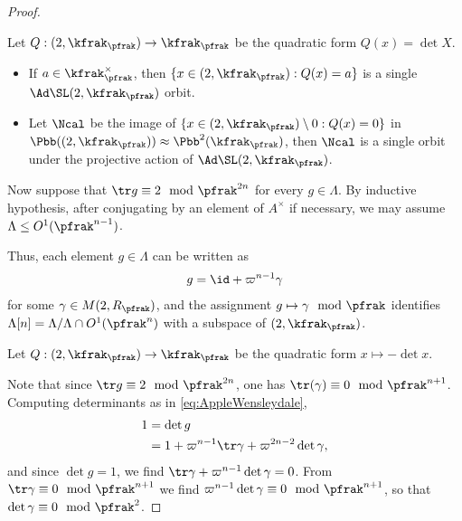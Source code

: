 \begin{proof}
    \begin{lemma}\label{lemma:killingform}
        Let $Q: \sl(2,\kfrak_\pfrak) \to \kfrak_\pfrak$ be the quadratic form $Q(x) = \det X$.
        \begin{itemize}
            \item If $a \in \kfrak_\pfrak^\times$, then $\{x \in \sl(2,\kfrak_\pfrak): Q(x) = a\}$ is a single $\Ad \SL(2,\kfrak_\pfrak)$ orbit.
            \item Let $\Ncal$ be the image of $\{x \in \sl(2,\kfrak_\pfrak) \setminus 0:  Q(x)=0\}$ in $\Pbb(\sl(2,\kfrak_\pfrak))\approx \Pbb^2(\kfrak_\pfrak)$, then $\Ncal$ is a single orbit under the projective action of $\Ad \SL(2,\kfrak_\pfrak)$.
        \end{itemize}

    \end{lemma}
    Now suppose that $\tr g \equiv 2 \mod \pfrak^{2n}$ for every $g\in \Lambda$. By inductive hypothesis, after conjugating by an element of $A^\times$ if necessary, we may assume $\Lambda \leq O^1(\pfrak^{n-1})$.

    Thus, each element $g\in \Lambda$ can be written as
    \begin{align}\label{eq:AppleWensleydale}
        g = \id +\varpi^{n-1} \gamma
    \end{align}
    for some $\gamma \in M(2, R_\pfrak)$, and the assignment $g \mapsto \gamma \mod \pfrak$ identifies $\Lambda[n] = \Lambda /\Lambda \cap O^1(\pfrak^n)$ with a subspace of  $\sl(2,\kfrak_\pfrak)$.

    \begin{claim}\label{claim:BreadfruitDessertnyjBelyj}
        Let $Q:\sl(2,\kfrak_\pfrak) \to \kfrak_\pfrak$ be the quadratic form $x \mapsto -\det x$.
    \end{claim}

    Note that since $\tr g \equiv 2 \mod \pfrak^{2n}$, one has $\tr(\gamma) \equiv 0 \mod \pfrak^{n+1}$.
    Computing determinants as in \ref{eq:AppleWensleydale},
    \begin{align*}
        1 & = \det g                                                  \\
          & = 1 + \varpi^{n-1} \tr \gamma + \varpi^{2n-2}\det \gamma,
    \end{align*}
    and since $\det g =1$, we find $\tr \gamma +\varpi^{n-1}\det \gamma =0$. From $\tr \gamma  \equiv 0 \mod \pfrak^{n+1}$ we find $ \varpi^{n-1}\det \gamma \equiv 0 \mod \pfrak^{n+1}$, so that $\det \gamma \equiv 0 \mod \pfrak^2$.





\end{proof}
